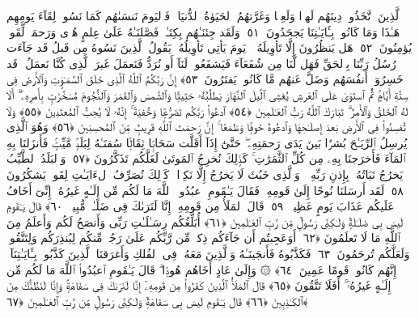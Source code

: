  ٱلَّذِينَ ٱتَّخَذُوا۟ دِينَهُم لَهوًۭا وَلَعِبًۭا وَغَرَّتهُمُ ٱلحَيَوٰةُ ٱلدُّنيَا ۚ فَٱليَومَ نَنسَىٰهُم كَمَا نَسُوا۟ لِقَآءَ يَومِهِم هَـٰذَا وَمَا كَانُوا۟ بِـَٔايَـٰتِنَا يَجحَدُونَ ﴿٥١﴾
 وَلَقَد جِئنَـٰهُم بِكِتَـٰبٍۢ فَصَّلنَـٰهُ عَلَىٰ عِلمٍ هُدًۭى وَرَحمَةًۭ لِّقَومٍۢ يُؤمِنُونَ ﴿٥٢﴾
 هَل يَنظُرُونَ إِلَّا تَأوِيلَهُۥ ۚ يَومَ يَأتِى تَأوِيلُهُۥ يَقُولُ ٱلَّذِينَ نَسُوهُ مِن قَبلُ قَد جَآءَت رُسُلُ رَبِّنَا بِٱلحَقِّ فَهَل لَّنَا مِن شُفَعَآءَ فَيَشفَعُوا۟ لَنَآ أَو نُرَدُّ فَنَعمَلَ غَيرَ ٱلَّذِى كُنَّا نَعمَلُ ۚ قَد خَسِرُوٓا۟ أَنفُسَهُم وَضَلَّ عَنهُم مَّا كَانُوا۟ يَفتَرُونَ ﴿٥٣﴾
 إِنَّ رَبَّكُمُ ٱللَّهُ ٱلَّذِى خَلَقَ ٱلسَّمَـٰوَٟتِ وَٱلأَرضَ فِى سِتَّةِ أَيَّامٍۢ ثُمَّ ٱستَوَىٰ عَلَى ٱلعَرشِ يُغشِى ٱلَّيلَ ٱلنَّهَارَ يَطلُبُهُۥ حَثِيثًۭا وَٱلشَّمسَ وَٱلقَمَرَ وَٱلنُّجُومَ مُسَخَّرَٰتٍۭ بِأَمرِهِۦٓ ۗ أَلَا لَهُ ٱلخَلقُ وَٱلأَمرُ ۗ تَبَارَكَ ٱللَّهُ رَبُّ ٱلعَـٰلَمِينَ ﴿٥٤﴾
 ٱدعُوا۟ رَبَّكُم تَضَرُّعًۭا وَخُفيَةً ۚ إِنَّهُۥ لَا يُحِبُّ ٱلمُعتَدِينَ ﴿٥٥﴾
 وَلَا تُفسِدُوا۟ فِى ٱلأَرضِ بَعدَ إِصلَـٰحِهَا وَٱدعُوهُ خَوفًۭا وَطَمَعًا ۚ إِنَّ رَحمَتَ ٱللَّهِ قَرِيبٌۭ مِّنَ ٱلمُحسِنِينَ ﴿٥٦﴾
 وَهُوَ ٱلَّذِى يُرسِلُ ٱلرِّيَـٰحَ بُشرًۢا بَينَ يَدَى رَحمَتِهِۦ ۖ حَتَّىٰٓ إِذَآ أَقَلَّت سَحَابًۭا ثِقَالًۭا سُقنَـٰهُ لِبَلَدٍۢ مَّيِّتٍۢ فَأَنزَلنَا بِهِ ٱلمَآءَ فَأَخرَجنَا بِهِۦ مِن كُلِّ ٱلثَّمَرَٰتِ ۚ كَذَٟلِكَ نُخرِجُ ٱلمَوتَىٰ لَعَلَّكُم تَذَكَّرُونَ ﴿٥٧﴾
 وَٱلبَلَدُ ٱلطَّيِّبُ يَخرُجُ نَبَاتُهُۥ بِإِذنِ رَبِّهِۦ ۖ وَٱلَّذِى خَبُثَ لَا يَخرُجُ إِلَّا نَكِدًۭا ۚ كَذَٟلِكَ نُصَرِّفُ ٱلءَايَـٰتِ لِقَومٍۢ يَشكُرُونَ ﴿٥٨﴾
 لَقَد أَرسَلنَا نُوحًا إِلَىٰ قَومِهِۦ فَقَالَ يَـٰقَومِ ٱعبُدُوا۟ ٱللَّهَ مَا لَكُم مِّن إِلَـٰهٍ غَيرُهُۥٓ إِنِّىٓ أَخَافُ عَلَيكُم عَذَابَ يَومٍ عَظِيمٍۢ ﴿٥٩﴾
 قَالَ ٱلمَلَأُ مِن قَومِهِۦٓ إِنَّا لَنَرَىٰكَ فِى ضَلَـٰلٍۢ مُّبِينٍۢ ﴿٦٠﴾
 قَالَ يَـٰقَومِ لَيسَ بِى ضَلَـٰلَةٌۭ وَلَـٰكِنِّى رَسُولٌۭ مِّن رَّبِّ ٱلعَـٰلَمِينَ ﴿٦١﴾
 أُبَلِّغُكُم رِسَـٰلَـٰتِ رَبِّى وَأَنصَحُ لَكُم وَأَعلَمُ مِنَ ٱللَّهِ مَا لَا تَعلَمُونَ ﴿٦٢﴾
 أَوَعَجِبتُم أَن جَآءَكُم ذِكرٌۭ مِّن رَّبِّكُم عَلَىٰ رَجُلٍۢ مِّنكُم لِيُنذِرَكُم وَلِتَتَّقُوا۟ وَلَعَلَّكُم تُرحَمُونَ ﴿٦٣﴾
 فَكَذَّبُوهُ فَأَنجَينَـٰهُ وَٱلَّذِينَ مَعَهُۥ فِى ٱلفُلكِ وَأَغرَقنَا ٱلَّذِينَ كَذَّبُوا۟ بِـَٔايَـٰتِنَآ ۚ إِنَّهُم كَانُوا۟ قَومًا عَمِينَ ﴿٦٤﴾
 ۞ وَإِلَىٰ عَادٍ أَخَاهُم هُودًۭا ۗ قَالَ يَـٰقَومِ ٱعبُدُوا۟ ٱللَّهَ مَا لَكُم مِّن إِلَـٰهٍ غَيرُهُۥٓ ۚ أَفَلَا تَتَّقُونَ ﴿٦٥﴾
 قَالَ ٱلمَلَأُ ٱلَّذِينَ كَفَرُوا۟ مِن قَومِهِۦٓ إِنَّا لَنَرَىٰكَ فِى سَفَاهَةٍۢ وَإِنَّا لَنَظُنُّكَ مِنَ ٱلكَـٰذِبِينَ ﴿٦٦﴾
 قَالَ يَـٰقَومِ لَيسَ بِى سَفَاهَةٌۭ وَلَـٰكِنِّى رَسُولٌۭ مِّن رَّبِّ ٱلعَـٰلَمِينَ ﴿٦٧﴾
